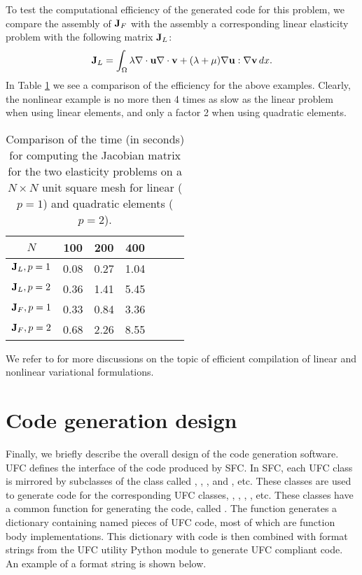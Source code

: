 To test the computational efficiency of the generated code
for this problem, we compare the assembly of $\mathbf{J}_F$ with the assembly a corresponding linear
elasticity problem with the following matrix $\mathbf{J}_L$:
\[
\mathbf{J}_L = \int_\Omega \lambda \nabla \cdot \mathbf{u} \nabla \cdot \mathbf{v} + (\lambda + \mu)\nabla \mathbf{u}:\nabla \mathbf{v} \, dx . 
\]
In Table \ref{SFCtest} we see a comparison of the efficiency for the above examples. 
Clearly, the nonlinear example is no more then 4 times as slow as the linear problem when using linear elements, and only a factor 2 when 
using quadratic elements. 
\begin{table}[h]
\begin{center}
\begin{tabular}{|c|c|c|c|c|c|c|} \hline
$N$              & 100   & 200  & 400    \\ \hline 
$\mathbf{J}_L, p=1$     & 0.08  & 0.27  & 1.04     \\ \hline 
$\mathbf{J}_L, p=2$     & 0.36  & 1.41  & 5.45      \\ \hline 
$\mathbf{J}_F, p=1$     & 0.33  & 0.84  & 3.36     \\ \hline 
$\mathbf{J}_F, p=2$     & 0.68  & 2.26  & 8.55     \\ \hline 
\end{tabular}
\caption{Comparison of the time (in seconds) for computing the Jacobian matrix for 
the two elasticity problems on a $N\times N$ unit square mesh for linear ($p=1$) and quadratic elements ($p=2$).} 
\label{SFCtest}
\end{center}
\end{table}

We refer to
\citep{AlnaesMardal2009b,OelgaardLoggWells2008,KirbyLogg2008,OelgaardWells2010}   
for more discussions on the topic of efficient compilation of linear and nonlinear variational formulations. 



\section{Code generation design}


Finally, we briefly describe the overall design of the code generation software.
UFC defines the interface of the code produced by SFC. 
In SFC, each UFC class is mirrored by  subclasses of the class  called 
, , , and , etc. 
These classes are used 
to generate code for the corresponding UFC classes, , , , 
, etc. These classes have 
a common function for generating the code, called .  
The function  generates a dictionary containing named
pieces of UFC code, most of which are function body implementations.
This dictionary with code is then combined with format strings from the
UFC utility Python module to generate UFC compliant code.  
An example of a format string is shown below.

